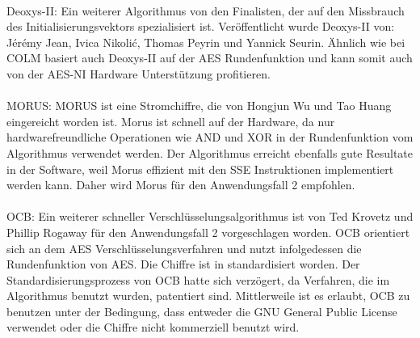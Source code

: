 \\
Deoxys-II:
Ein weiterer Algorithmus von den Finalisten, der auf den Missbrauch des Initialisierungsvektors spezialisiert ist. Veröffentlicht wurde Deoxys-II von: Jérémy Jean, Ivica Nikolić, Thomas Peyrin und Yannick Seurin. Ähnlich wie bei COLM basiert auch Deoxys-II auf der AES Rundenfunktion und kann somit auch von der \gls{AES-NI} Hardware Unterstützung profitieren\cite{Jean2016}.\\
\\
MORUS:
MORUS ist eine Stromchiffre, die von Hongjun Wu und Tao Huang eingereicht worden ist.
Morus ist schnell auf der Hardware, da nur hardwarefreundliche Operationen wie AND und XOR in der Rundenfunktion vom Algorithmus verwendet werden. Der Algorithmus erreicht ebenfalls gute Resultate in der Software, weil Morus  effizient mit den \gls{SSE} Instruktionen implementiert werden kann. Daher wird Morus für den Anwendungsfall 2 empfohlen\cite{wuauthenticated}.  \\
\\
OCB:
Ein weiterer schneller Verschlüsselungsalgorithmus ist von Ted Krovetz und Phillip Rogaway für den Anwendungsfall 2 vorgeschlagen worden. OCB orientiert sich an dem \gls{AES} Verschlüsselungsverfahren und nutzt infolgedessen die Rundenfunktion von AES. Die Chiffre ist in \cite{rfc7253} standardisiert worden. Der Standardisierungsprozess von OCB hatte sich verzögert, da Verfahren, die im Algorithmus benutzt wurden, patentiert sind. Mittlerweile ist es erlaubt, OCB zu benutzen unter der Bedingung, dass entweder die GNU General Public License verwendet oder die Chiffre nicht kommerziell benutzt wird\cite{krovetz2016ocb}.
